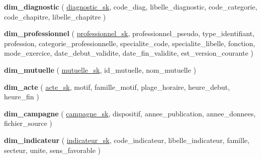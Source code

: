 \begin{mldlist}
\item \textbf{dim\_diagnostic} ( \underline{diagnostic\_sk}, code\_diag, libelle\_diagnostic, code\_categorie, code\_chapitre, libelle\_chapitre )
\item \textbf{dim\_professionnel} ( \underline{professionnel\_sk}, professionnel\_pseudo, type\_identifiant, profession, categorie\_professionnelle, specialite\_code, specialite\_libelle, fonction, mode\_exercice, date\_debut\_validite, date\_fin\_validite, est\_version\_courante )
\item \textbf{dim\_mutuelle} ( \underline{mutuelle\_sk}, id\_mutuelle, nom\_mutuelle )
\item \textbf{dim\_acte} ( \underline{acte\_sk}, motif, famille\_motif, plage\_horaire, heure\_debut, heure\_fin )
\item \textbf{dim\_campagne} ( \underline{campagne\_sk}, dispositif, annee\_publication, annee\_donnees, fichier\_source )
\item \textbf{dim\_indicateur} ( \underline{indicateur\_sk}, code\_indicateur, libelle\_indicateur, famille, secteur, unite, sens\_favorable )
\end{mldlist}